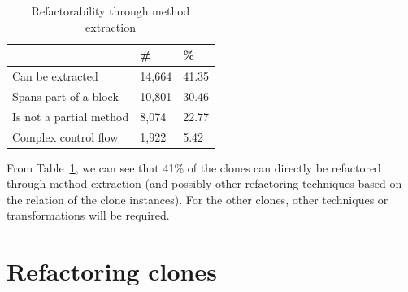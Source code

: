 \begin{table}[H]
  \begin{center}
  \caption{Refactorability through method extraction} \label{table:refactorability}
  \medskip
\begin{tabular}{|l|l|l|}
\hline
\textbf{}         & \textbf{\#} & \textbf{\%} \\ \hline
Can be extracted     & 14,664 & 41.35 \\ \hline
Spans part of a block  & 10,801 & 30.46 \\ \hline
Is not a partial method   & 8,074 & 22.77 \\ \hline
Complex control flow & 1,922 & 5.42 \\ \hline
\end{tabular}
\end{center}
\end{table}

From Table~\ref{table:refactorability}, we can see that 41\% of the clones can directly be refactored through method extraction (and possibly other refactoring techniques based on the relation of the clone instances). For the other clones, other techniques or transformations will be required.

\section{Refactoring clones}
